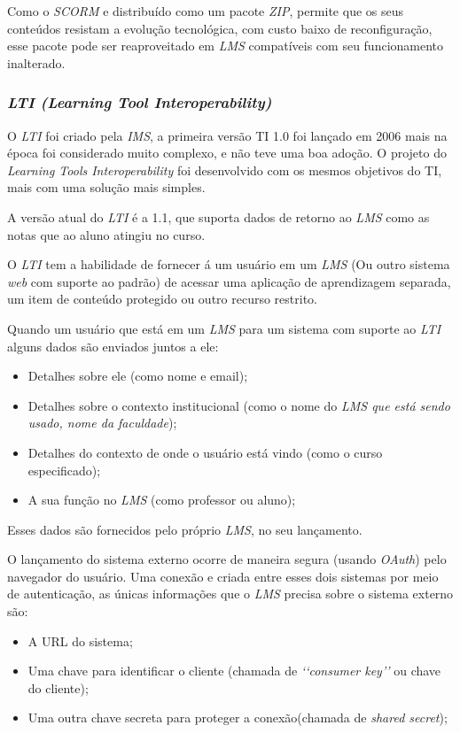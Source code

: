 Como o \textit{SCORM} e distribuído como um pacote \textit{ZIP}, permite que os seus conteúdos resistam a evolução tecnológica, com custo baixo de reconfiguração, esse pacote pode ser reaproveitado em \textit{LMS} compatíveis com seu funcionamento inalterado.

\subsubsection{\textit{LTI (Learning Tool Interoperability)}}
O \textit{LTI} foi criado pela \textit{IMS}, a primeira versão TI 1.0 foi lançado em 2006 mais na época foi considerado muito complexo, e não teve uma boa adoção. O projeto do \textit{Learning Tools Interoperability} foi desenvolvido com os mesmos objetivos do TI, mais com uma solução mais simples. \cite{ims}

A versão atual do \textit{LTI} é a 1.1, que suporta dados de retorno ao \textit{LMS} como as notas que ao aluno atingiu no curso.

\begin{citacao}
  O \textit{LTI} tem a habilidade de fornecer á um usuário em um \textit{LMS} (Ou outro sistema \textit{web} com suporte ao padrão) de acessar uma aplicação de aprendizagem separada, um item de conteúdo protegido ou outro recurso restrito. \cite[p.~2, tradução nossa]{vickers-ims}
\end{citacao}

Quando um usuário que está em um \textit{LMS} para um sistema com suporte ao \textit{LTI} alguns dados são enviados juntos a ele:
\begin{itemize}
    \item Detalhes sobre ele (como nome e email);
    \item Detalhes sobre o contexto institucional (como o nome do \textit{LMS que está sendo usado, nome da faculdade});
    \item Detalhes do contexto de onde o usuário está vindo (como o curso especificado);
    \item A sua função no \textit{LMS} (como professor ou aluno);
\end{itemize}
Esses dados são fornecidos pelo próprio \textit{LMS}, no seu lançamento.

O lançamento do sistema externo ocorre de maneira segura (usando \textit{OAuth}) pelo navegador do usuário. Uma conexão e criada entre esses dois sistemas por meio de autenticação, as únicas informações que o \textit{LMS} precisa sobre o sistema externo são:
\begin{itemize}
    \item A \ac{URL} do sistema;
    \item Uma chave para identificar o cliente (chamada de \textit{\lq\lq consumer key\rq\rq} ou chave do cliente);
    \item Uma outra chave secreta para proteger a conexão(chamada de \textit{shared secret});
\end{itemize}


